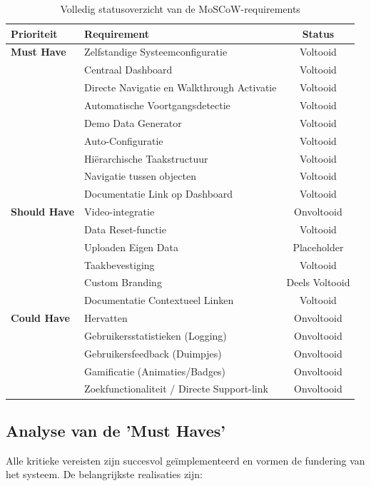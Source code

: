 \begin{table}[H]
	\centering
	\caption{Volledig statusoverzicht van de MoSCoW-requirements}
	\label{tab:moscow_volledig}
	\small
	\begin{tabular}{@{}llc@{}}
		\toprule
		\textbf{Prioriteit} & \textbf{Requirement} & \textbf{Status} \\ \midrule
		\textbf{Must Have} & Zelfstandige Systeemconfiguratie  & Voltooid \\
		& Centraal Dashboard  & Voltooid \\
		& Directe Navigatie en Walkthrough Activatie & Voltooid \\
		& Automatische Voortgangsdetectie  & Voltooid \\
		& Demo Data Generator  & Voltooid \\
		& Auto-Configuratie & Voltooid \\
		& Hiërarchische Taakstructuur  & Voltooid \\
		& Navigatie tussen objecten  & Voltooid \\
		& Documentatie Link op Dashboard & Voltooid \\ \midrule
		\textbf{Should Have} & Video-integratie  & Onvoltooid \\
		& Data Reset-functie  & Voltooid \\
		& Uploaden Eigen Data  & Placeholder \\
		& Taakbevestiging  & Voltooid \\
		& Custom Branding  & Deels Voltooid \\
		& Documentatie Contextueel Linken  & Voltooid \\ \midrule
		\textbf{Could Have} & Hervatten  & Onvoltooid \\
		& Gebruikersstatistieken (Logging) & Onvoltooid \\
		& Gebruikersfeedback (Duimpjes) & Onvoltooid \\
		& Gamificatie (Animaties/Badges) & Onvoltooid\\
		& Zoekfunctionaliteit / Directe Support-link & Onvoltooid \\ \midrule
		
	\end{tabular}
\end{table}

\subsection{Analyse van de 'Must Haves'}
Alle kritieke vereisten zijn succesvol geïmplementeerd en vormen de fundering van het systeem. De belangrijkste realisaties zijn:

